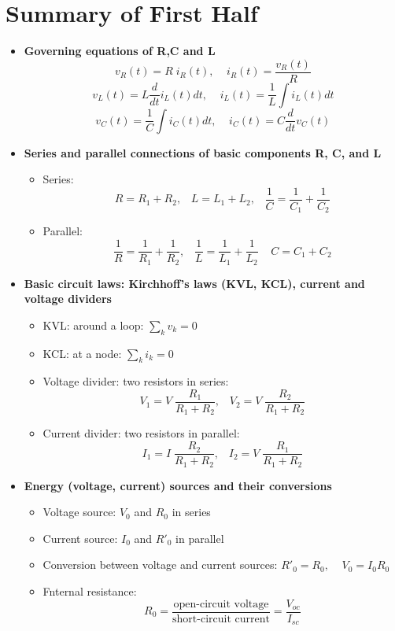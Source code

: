 \usepackage{html}
\textwidth 6.0in
\topmargin -0.5in
\oddsidemargin -0in
\evensidemargin -0.5in


\section*{Summary of First Half}

\begin{itemize}

\item \bf{Governing equations of R,C and L}
  \[ v_R(t)=R\;i_R(t),\;\;\;\;i_R(t)=\frac{v_R(t)}{R} \]
  \[ v_L(t)=L\frac{d}{dt} i_L(t) dt,\;\;\;\;i_L(t)=\frac{1}{L}\int i_L(t) dt\]
  \[ v_C(t)=\frac{1}{C}\int i_C(t) dt,\;\;\;\;i_C(t)=C\frac{d}{dt} v_C(t) \]

\item \bf{Series and parallel connections of basic components R, C, and L}
\begin{itemize}
\item Series:
  \[ R=R_1+R_2,\;\;\;L=L_1+L_2,\;\;\;\frac{1}{C}=\frac{1}{C_1}+\frac{1}{C_2} \]
\item Parallel: 
  \[ \frac{1}{R}=\frac{1}{R_1}+\frac{1}{R_2},\;\;\;\frac{1}{L}=\frac{1}{L_1}+\frac{1}{L_2}\;\;\;\;C=C_1+C_2 \]

\end{itemize}

\item \bf{Basic circuit laws: Kirchhoff's laws (KVL, KCL), current and voltage 
  dividers}
  \begin{itemize}
    \item KVL: around a loop: $\sum_k v_k=0$
    \item KCL: at a node: $\sum_k i_k=0$
    \item Voltage divider: two resistors in series:
      \[V_1=V\; \frac{R_1}{R_1+R_2},\;\;\; V_2=V\; \frac{R_2}{R_1+R_2}\]
    \item Current divider: two resistors in parallel:
      \[I_1=I\; \frac{R_2}{R_1+R_2},\;\;\; I_2=V\; \frac{R_1}{R_1+R_2}\]
  \end{itemize}

\item \bf{Energy (voltage, current) sources and their conversions}
  \begin{itemize}
    \item Voltage source: $V_0$ and $R_0$ in series
    \item Current source: $I_0$ and $R'_0$ in parallel
    \item Conversion between voltage and current sources:
      $R'_0=R_0,\;\;\;\;V_0=I_0 R_0$
    \item Fnternal resistance:
\[ R_0=\frac{\mbox{open-circuit voltage}}{\mbox{short-circuit current}}
  =\frac{V_{oc}}{I_{sc}} \]      
  \end{itemize}
  

\end{itemize}
